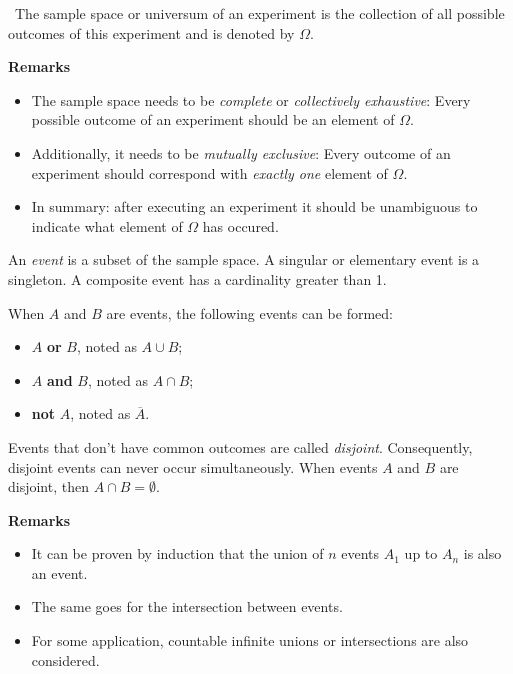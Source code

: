 \begin{definition}\
   The sample space or universum of an experiment
   is the collection of all possible outcomes of this experiment and
   is denoted by $\Omega$.
   \end{definition}

   \textbf{Remarks}
   \begin{itemize}
   \item The sample space needs to be \emph{complete} or \emph{collectively exhaustive}\/: 
   Every possible outcome of an experiment should be an element of $\Omega$.
   \item Additionally, it needs to be \emph{mutually exclusive}\/:
   Every outcome of an experiment should correspond with \emph{exactly one} element of $\Omega$.
   \item In summary: after executing an experiment it should be unambiguous 
   to indicate what element of $\Omega$ has occured.
   \end{itemize}
   
   \begin{definition}[Event]
    An \emph{event} is a subset of the sample space. A singular or elementary event is a singleton. A composite event has a cardinality greater than 1.
\end{definition}

When $A$ and $B$ are events, the following events can be formed:
\begin{itemize}
    \item $A$ \textbf{or} $B$, noted as $A \cup B$;
    \item $A$ \textbf{and} $B$, noted as $A \cap B$;
    \item \textbf{not} $A$, noted as $\overline{A}$.
\end{itemize}

Events that don't have common outcomes are called \emph{disjoint}.
Consequently, disjoint events can never occur simultaneously. 
When events $A$ and $B$ are disjoint, then $A \cap B = \emptyset$. 

\textbf{Remarks}
\begin{itemize}
   \item It can be proven by induction that the union of $n$ events $A_1$ up to $A_n$ is also an event.
   \item The same goes for the intersection between events.
   \item For some application, countable infinite unions or intersections are also considered.
\end{itemize}
   
